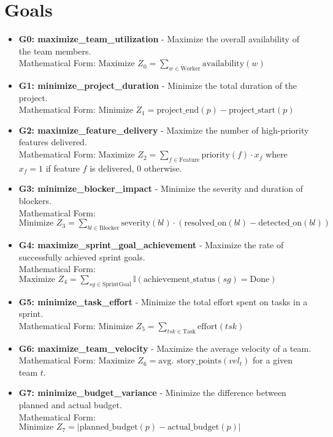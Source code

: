 \documentclass[11pt]{article}
\begin{document}
\section{Goals}
\begin{itemize}
    \item \textbf{G0: maximize\_team\_utilization} - Maximize the overall availability of the team members.
    \\Mathematical Form: $\text{Maximize } Z_0 = \sum_{w \in \text{Worker}} \text{availability}(w)$
    
    \item \textbf{G1: minimize\_project\_duration} - Minimize the total duration of the project.
    \\Mathematical Form: $\text{Minimize } Z_1 = \text{project\_end}(p) - \text{project\_start}(p)$
    
    \item \textbf{G2: maximize\_feature\_delivery} - Maximize the number of high-priority features delivered.
    \\Mathematical Form: $\text{Maximize } Z_2 = \sum_{f \in \text{Feature}} \text{priority}(f) \cdot x_f$ where $x_f = 1$ if feature $f$ is delivered, $0$ otherwise.
    
    \item \textbf{G3: minimize\_blocker\_impact} - Minimize the severity and duration of blockers.
    \\Mathematical Form: $\text{Minimize } Z_3 = \sum_{bl \in \text{Blocker}} \text{severity}(bl) \cdot (\text{resolved\_on}(bl) - \text{detected\_on}(bl))$
    
    \item \textbf{G4: maximize\_sprint\_goal\_achievement} - Maximize the rate of successfully achieved sprint goals.
    \\Mathematical Form: $\text{Maximize } Z_4 = \sum_{sg \in \text{SprintGoal}} \mathbb{I}(\text{achievement\_status}(sg) = \text{Done})$
    
    \item \textbf{G5: minimize\_task\_effort} - Minimize the total effort spent on tasks in a sprint.
    \\Mathematical Form: $\text{Minimize } Z_5 = \sum_{tsk \in \text{Task}} \text{effort}(tsk)$
    
    \item \textbf{G6: maximize\_team\_velocity} - Maximize the average velocity of a team.
    \\Mathematical Form: $\text{Maximize } Z_6 = \text{avg. story\_points}(vel_t)$ for a given team $t$.
    
    \item \textbf{G7: minimize\_budget\_variance} - Minimize the difference between planned and actual budget.
    \\Mathematical Form: $\text{Minimize } Z_7 = | \text{planned\_budget}(p) - \text{actual\_budget}(p) |$
\end{itemize}
\end{document}
